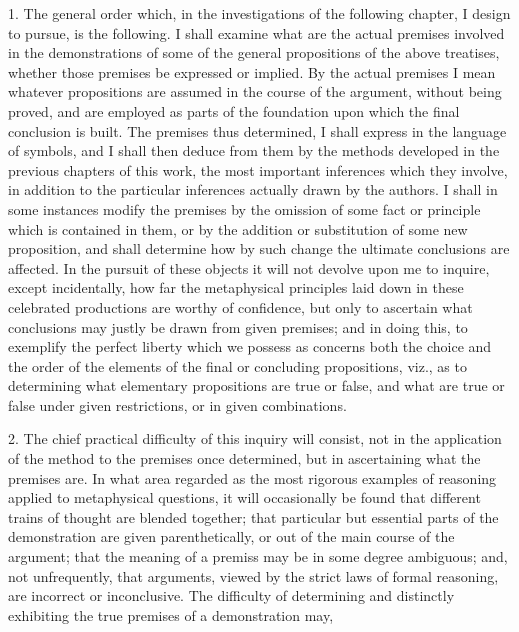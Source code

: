 \documentclass[oneside]{book}
\begin{document}
1. The general order which, in the investigations of the following
chapter, I design to pursue, is the following. I
shall examine what are the actual premises involved in the demonstrations
of some of the general propositions of the above
treatises, whether those premises be expressed or implied. By
the actual premises I mean whatever propositions are assumed
in the course of the argument, without being proved, and are
employed as parts of the foundation upon which the final conclusion
is built. The premises thus determined, I shall express in
the language of symbols, and I shall then deduce from them by
the methods developed in the previous chapters of this work, the
most important inferences which they involve, in addition to the
particular inferences actually drawn by the authors. I shall in
some instances modify the premises by the omission of some fact
or principle which is contained in them, or by the addition or
substitution of some new proposition, and shall determine how
by such change the ultimate conclusions are affected. In the
pursuit of these objects it will not devolve upon me to inquire,
except incidentally, how far the metaphysical principles laid down
in these celebrated productions are worthy of confidence, but
only to ascertain what conclusions may justly be drawn from
given premises; and in doing this, to exemplify the perfect liberty
which we possess as concerns both the choice and the
order of the elements of the final or concluding propositions, viz.,
as to determining what elementary propositions are true or false,
and what are true or false under given restrictions, or in given
combinations.

2. The chief practical difficulty of this inquiry will consist,
not in the application of the method to the premises once determined,
but in ascertaining what the premises are. In what area
regarded as the most rigorous examples of reasoning applied to
metaphysical questions, it will occasionally be found that different
trains of thought are blended together; that particular but essential
parts of the demonstration are given parenthetically, or out
of the main course of the argument; that the meaning of a premiss
may be in some degree ambiguous; and, not unfrequently,
that arguments, viewed by the strict laws of formal reasoning,
are incorrect or inconclusive. The difficulty of determining and
distinctly exhibiting the true premises of a demonstration may,
\end{document}
